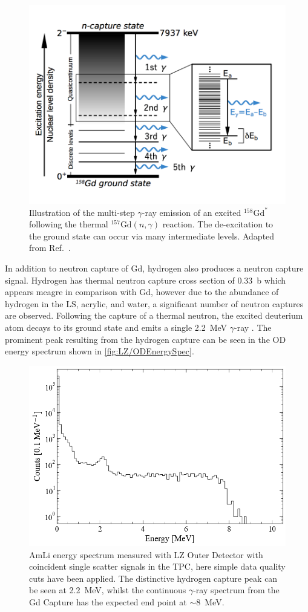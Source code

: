 \begin{figure}[!ht]
    \centering
    \includegraphics[width=0.8\linewidth]{figures/LZ/ContinuumEmission2.png}
    \caption{Illustration of the multi-step $\gamma$-ray emission of an excited $^{158}\text{Gd}^*$ following the thermal $^{157}\text{Gd}(n,\gamma)$ reaction. The de-excitation to the ground state can occur via many intermediate levels. Adapted from Ref.~\cite{Hagiwara:2018kmr}.}
    \label{fig:LZ/Gd158Deexcite}
\end{figure}
In addition to neutron capture of Gd, hydrogen also produces a neutron capture signal. Hydrogen has thermal neutron capture cross section of 0.33~b which appears meagre in comparison with Gd, however due to the abundance of hydrogen in the LS, acrylic, and water, a significant number of neutron captures are observed. Following the capture of a thermal neutron, the excited deuterium atom decays to its ground state and emits a single 2.2~MeV $\gamma$-ray \cite{LZTDR}. The prominent peak resulting from the hydrogen capture can be seen in the OD energy spectrum shown in \autoref{fig:LZ/ODEnergySpec}.
\begin{figure}[!ht]
    \centering
    \includegraphics[width=0.8\linewidth]{figures/LZ/ODEnergySpec.png}
    \caption{AmLi energy spectrum measured with LZ Outer Detector with coincident single scatter signals in the TPC, here simple data quality cuts have been applied. The distinctive hydrogen capture peak can be seen at 2.2~MeV, whilst the continuous $\gamma$-ray spectrum from the Gd Capture has the expected end point at $\mathtt{\sim}$8~MeV.}
    \label{fig:LZ/ODEnergySpec}
\end{figure}
